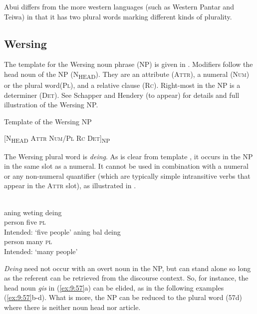 Abui differs from the more western languages (such as Western Pantar and Teiwa) in that it has two plural words marking different kinds of plurality.

\subsection{Wersing} %
\label{sec:9:3.5}
The template for the Wersing noun phrase (NP) is given in . Modifiers follow the head noun of the NP (\textsc{N}\textsubscript{\MakeUppercase{head}}). They are an attribute (\textsc{Attr}), a numeral (\textsc{Num}) or the plural word\textsc{(Pl),} and a relative clause (\textsc{Rc).} \textsc{R}ight-most in the NP is a determiner (\textsc{Det}). See Schapper and Hendery (to appear) for details and full illustration of the Wersing NP.

\ea%
\label{ex:9:55}
\upshape 
 Template of the Wersing NP 

  [\textsc{N}\textsubscript{\MakeUppercase{head } }\textsc{Attr Num/Pl  Rc  Det]}\textsc{\textsubscript{NP}}
\z


The Wersing plural word is \textit{deing}. As is clear from template , it occurs in the NP in the same slot as a numeral. It cannot be used in combination with a numeral or any non-numeral quantifier (which are typically simple intransitive verbs that appear in the \textsc{Attr} slot), as illustrated in .


\ea%
\label{ex:9:56}
 \\
\ea
\gll *aning    weting deing \\
    person five \textsc{pl} \\
 \glt Intended: `five people'
\ex
\gll *aning bal {deing}\\
   person many   \textsc{pl} \\
\glt  Intended: `many people'
\z
\z






\textit{Deing} need not occur with an overt noun in the NP, but can stand alone so long as the referent can be retrieved from the discourse context. So, for instance, the head noun \textit{gis} in (\ref{ex:9:57}a) can be elided, as in the following examples (\ref{ex:9:57}b-d). What is more, the NP can be reduced to the plural word (57d) where there is neither noun head nor article.


